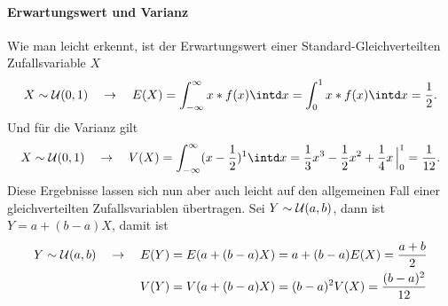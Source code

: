 \paragraph{Erwartungswert und Varianz}
Wie man leicht erkennt, ist der Erwartungswert einer Standard-Gleichverteilten Zufallsvariable $X$
\begin{equation*}
	X\sim\uniform(0,1) \quad \rightarrow \quad E(X)=\int_{-\infty}^\infty x*f(x)\intd x=\int_{0}^1 x*f(x)\intd x=\frac 12.
\end{equation*}
Und für die Varianz gilt
\begin{equation*}
	X\sim\uniform(0,1) \quad \rightarrow \quad V(X)=\int_{-\infty}^\infty (x-\frac12)^1\intd x=\frac13 x^3-\frac12x^2+\frac14 x\,\Big|_0^1=\frac1{12}.
\end{equation*}
Diese Ergebnisse lassen sich nun aber auch leicht auf den allgemeinen Fall einer gleichverteilten Zufallsvariablen übertragen.
Sei $Y\sim\mathcal{U}(a,b)$, dann ist $Y=a+(b-a)X$, damit ist
\begin{align*}
	Y\sim\mathcal{U}(a,b)\quad\rightarrow\quad E(Y)&=E(a+(b-a)X)=a+(b-a)E(X)=\frac{a+b}{2}\\
	V(Y)&=V(a+(b-a)X)=(b-a)^2V(X)=\frac{(b-a)^2}{12}
\end{align*}
